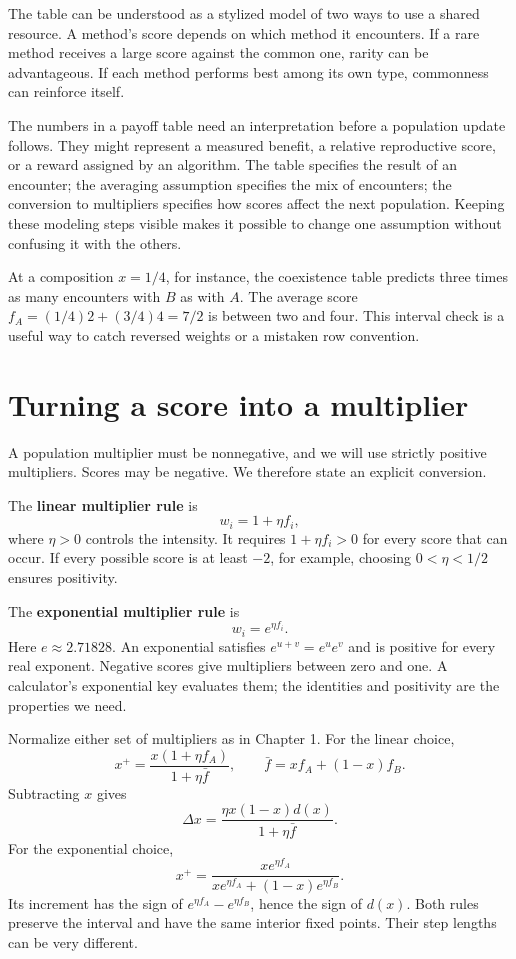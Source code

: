\documentclass[11pt,oneside,openany]{book}
\theoremstyle{definition}
\theoremstyle{remark}
\numberwithin{equation}{chapter}
\begin{document}
The table can be understood as a stylized model of two ways to use a shared resource. A method's score depends on which method it encounters. If a rare method receives a large score against the common one, rarity can be advantageous. If each method performs best among its own type, commonness can reinforce itself.

The numbers in a payoff table need an interpretation before a population update follows. They might represent a measured benefit, a relative reproductive score, or a reward assigned by an algorithm. The table specifies the result of an encounter; the averaging assumption specifies the mix of encounters; the conversion to multipliers specifies how scores affect the next population. Keeping these modeling steps visible makes it possible to change one assumption without confusing it with the others.

At a composition \(x=1/4\), for instance, the coexistence table predicts three times as many encounters with \(B\) as with \(A\). The average score \(f_A=(1/4)2+(3/4)4=7/2\) is between two and four. This interval check is a useful way to catch reversed weights or a mistaken row convention.

\section{Turning a score into a multiplier}\label{ch02-turning-a-score-into-a-multiplier}

A population multiplier must be nonnegative, and we will use strictly positive multipliers. Scores may be negative. We therefore state an explicit conversion.

The \textbf{linear multiplier rule} is \[w_i=1+\eta f_i,\] where \(\eta>0\) controls the intensity. It requires \(1+\eta f_i>0\) for every score that can occur. If every possible score is at least \(-2\), for example, choosing \(0<\eta<1/2\) ensures positivity.

The \textbf{exponential multiplier rule} is \[w_i=e^{\eta f_i}.\] Here \(e\approx2.71828\). An exponential satisfies \(e^{u+v}=e^u e^v\) and is positive for every real exponent. Negative scores give multipliers between zero and one. A calculator's exponential key evaluates them; the identities and positivity are the properties we need.

Normalize either set of multipliers as in Chapter 1. For the linear choice, \[x^+=\frac{x(1+\eta f_A)}{1+\eta\bar f},\qquad
\bar f=xf_A+(1-x)f_B.\] Subtracting \(x\) gives \[\Delta x=\frac{\eta x(1-x)d(x)}{1+\eta\bar f}.\] For the exponential choice, \[x^+=\frac{xe^{\eta f_A}}{xe^{\eta f_A}+(1-x)e^{\eta f_B}}.\] Its increment has the sign of \(e^{\eta f_A}-e^{\eta f_B}\), hence the sign of \(d(x)\). Both rules preserve the interval and have the same interior fixed points. Their step lengths can be very different.
\end{document}
